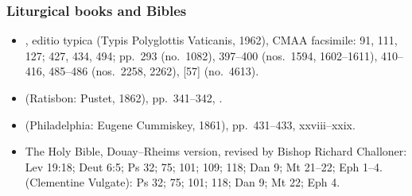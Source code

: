 {\scriptsize
\subsubsection*{Liturgical books and Bibles}
\begin{itemize}\setlength{\itemsep}{0.15em}\setlength{\parskip}{0pt}
\item {}, editio typica (Typis Polyglottis Vaticanis, 1962), CMAA facsimile:  91, 111, 127;  427, 434, 494; pp.~293 (no.~1082), 397--400 (nos.~1594, 1602--1611), 410--416, 485--486 (nos.~2258, 2262), [57] (no.~4613).
\item {} (Ratisbon: Pustet, 1862), pp.~341--342, .
\item {} (Philadelphia: Eugene Cummiskey, 1861), pp.~431--433, xxviii--xxix.
\item The Holy Bible, Douay--Rheims version, revised by Bishop Richard Challoner: Lev 19:18; Deut 6:5; Ps 32; 75; 101; 109; 118; Dan 9; Mt 21--22; Eph 1--4.  (Clementine Vulgate): Ps 32; 75; 101; 118; Dan 9; Mt 22; Eph 4.
\end{itemize}

}
